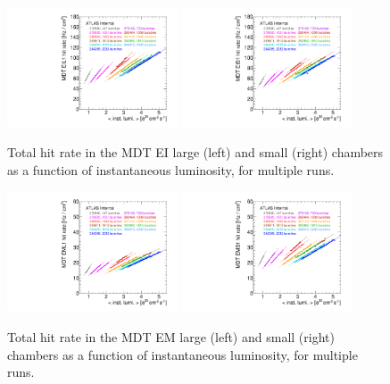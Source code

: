 \begin{figure}
  \begin{center}
    \includegraphics[width=0.45\textwidth]{./figures/rate_raw_vs_lumi_vs_evts_mdt_EIL1_overlay.pdf}
    \includegraphics[width=0.45\textwidth]{./figures/rate_raw_vs_lumi_vs_evts_mdt_EIS1_overlay.pdf}
    \caption{Total hit rate in the MDT EI large (left) and small (right) chambers as a function of instantaneous luminosity, for multiple runs.}
    \label{fig:hitrates-vs-lumi-mdt-ei1-raw}
  \end{center}
\end{figure}

\begin{figure}
  \begin{center}
    \includegraphics[width=0.45\textwidth]{./figures/rate_raw_vs_lumi_vs_evts_mdt_EML1_overlay.pdf}
    \includegraphics[width=0.45\textwidth]{./figures/rate_raw_vs_lumi_vs_evts_mdt_EMS1_overlay.pdf}
    \caption{Total hit rate in the MDT EM large (left) and small (right) chambers as a function of instantaneous luminosity, for multiple runs.}
    \label{fig:hitrates-vs-lumi-mdt-em1-raw}
  \end{center}
\end{figure}

